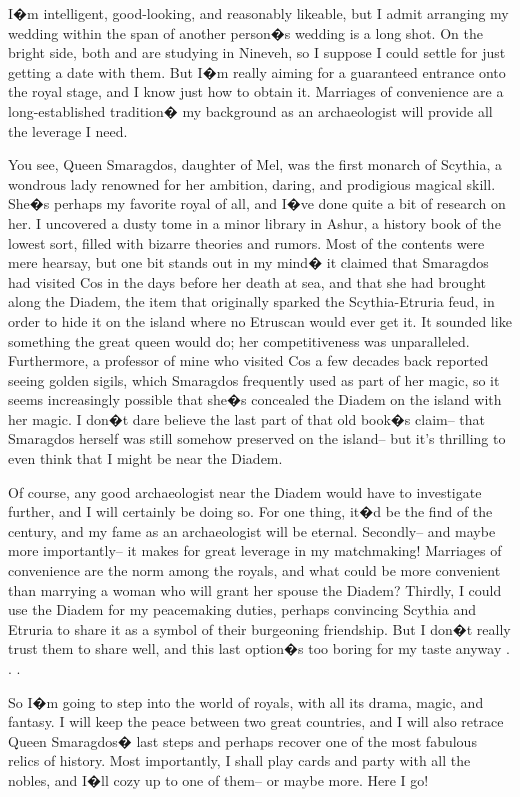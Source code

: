 \documentclass[char]{Kos}
\begin{document}
I�m intelligent, good-looking, and reasonably likeable, but I admit arranging my wedding within the span of another person�s wedding is a long shot. On the bright side, both \cPoet{\nickname} and \cWard{\nickname} are studying in Nineveh, so I suppose I could settle for just getting a date with them. But I�m really aiming for a guaranteed entrance onto the royal stage, and I know just how to obtain it. Marriages of convenience are a long-established tradition� my background as an archaeologist will provide all the leverage I need.

You see, Queen Smaragdos, daughter of Mel, was the first monarch of Scythia, a wondrous lady renowned for her ambition, daring, and prodigious magical skill. She�s perhaps my favorite royal of all, and I�ve done quite a bit of research on her. I uncovered a dusty tome in a minor library in Ashur, a history book of the lowest sort, filled with bizarre theories and rumors. Most of the contents were mere hearsay, but one bit stands out in my mind� it claimed that Smaragdos had visited Cos in the days before her death at sea, and that she had brought along the Diadem, the item that originally sparked the Scythia-Etruria feud, in order to hide it on the island where no Etruscan would ever get it. It sounded like something the great queen would do; her competitiveness was unparalleled. Furthermore, a professor of mine who visited Cos a few decades back reported seeing golden sigils, which Smaragdos frequently used as part of her magic, so it seems increasingly possible that she�s concealed the Diadem on the island with her magic. I don�t dare believe the last part of that old book�s claim-- that Smaragdos herself was still somehow preserved on the island-- but it's thrilling to even think that I might be near the Diadem.

Of course, any good archaeologist near the Diadem would have to investigate further, and I will certainly be doing so. For one thing, it�d be the find of the century, and my fame as an archaeologist will be eternal. Secondly-- and maybe more importantly-- it makes for great leverage in my matchmaking! Marriages of convenience are the norm among the royals, and what could be more convenient than marrying a woman who will grant her spouse the Diadem? Thirdly, I could use the Diadem for my peacemaking duties, perhaps convincing Scythia and Etruria to share it as a symbol of their burgeoning friendship. But I don�t really trust them to share well, and this last option�s too boring for my taste anyway . . .

So I�m going to step into the world of royals, with all its drama, magic, and fantasy. I will keep the peace between two great countries, and I will also retrace Queen Smaragdos� last steps and perhaps recover one of the most fabulous relics of history. Most importantly, I shall play cards and party with all the nobles, and I�ll cozy up to one of them-- or maybe more. Here I go!
\end{document}

